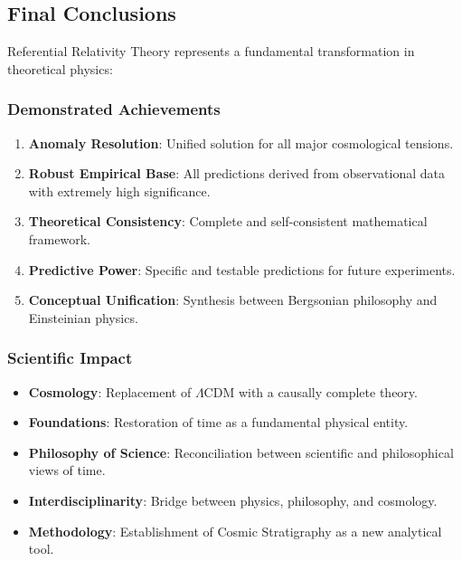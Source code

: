 \documentclass[12pt,a4paper]{article}
\begin{document}
\subsection{Final Conclusions}
Referential Relativity Theory represents a fundamental transformation in theoretical physics:

\subsubsection{Demonstrated Achievements}
\begin{enumerate}
    \item \textbf{Anomaly Resolution}: Unified solution for all major cosmological tensions.
    \item \textbf{Robust Empirical Base}: All predictions derived from observational data with extremely high significance.
    \item \textbf{Theoretical Consistency}: Complete and self-consistent mathematical framework.
    \item \textbf{Predictive Power}: Specific and testable predictions for future experiments.
    \item \textbf{Conceptual Unification}: Synthesis between Bergsonian philosophy and Einsteinian physics.
\end{enumerate}

\subsubsection{Scientific Impact}
\begin{itemize}
    \item \textbf{Cosmology}: Replacement of $\Lambda$CDM with a causally complete theory.
    \item \textbf{Foundations}: Restoration of time as a fundamental physical entity.
    \item \textbf{Philosophy of Science}: Reconciliation between scientific and philosophical views of time.
    \item \textbf{Interdisciplinarity}: Bridge between physics, philosophy, and cosmology.
    \item \textbf{Methodology}: Establishment of Cosmic Stratigraphy as a new analytical tool.
\end{itemize}
\end{document}
